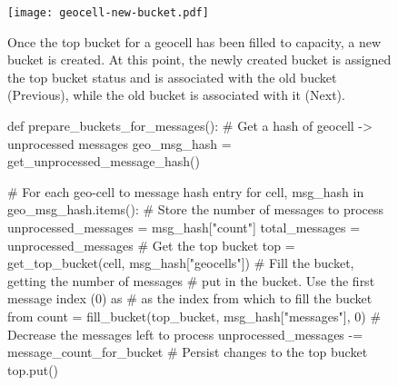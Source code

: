 \documentclass{article}
\begin{document}
\begin{figure}
\begin{center}
\texttt{[image: geocell-new-bucket.pdf]}
\caption{Once the top bucket for a geocell has been filled to capacity, a new bucket is created. At this point, the newly created bucket is assigned the top bucket status and is associated with the old bucket (Previous), while the old bucket is associated with it (Next).}
\label{fig:geocell_new_bucket}
\end{center}
\end{figure}

\begin{figure}
\begin{center}
\begin{minipage}{5.5in}%
\begin{python}
def prepare_buckets_for_messages():
  # Get a hash of geocell -> unprocessed messages
  geo_msg_hash = get_unprocessed_message_hash()

  # For each geo-cell to message hash entry
  for cell, msg_hash in geo_msg_hash.items():
    # Store the number of messages to process
    unprocessed_messages = msg_hash["count"]
    total_messages = unprocessed_messages
    # Get the top bucket
    top = get_top_bucket(cell, msg_hash["geocells"])
    # Fill the bucket, getting the number of messages
    # put in the bucket. Use the first message index (0) as
    # as the index from which to fill the bucket from
    count = fill_bucket(top_bucket, msg_hash["messages"], 0)
    # Decrease the messages left to process
    unprocessed_messages -= message_count_for_bucket
    # Persist changes to the top bucket
    top.put()


\end{python}
\end{minipage}
\end{center}
\end{figure}
\end{document}
